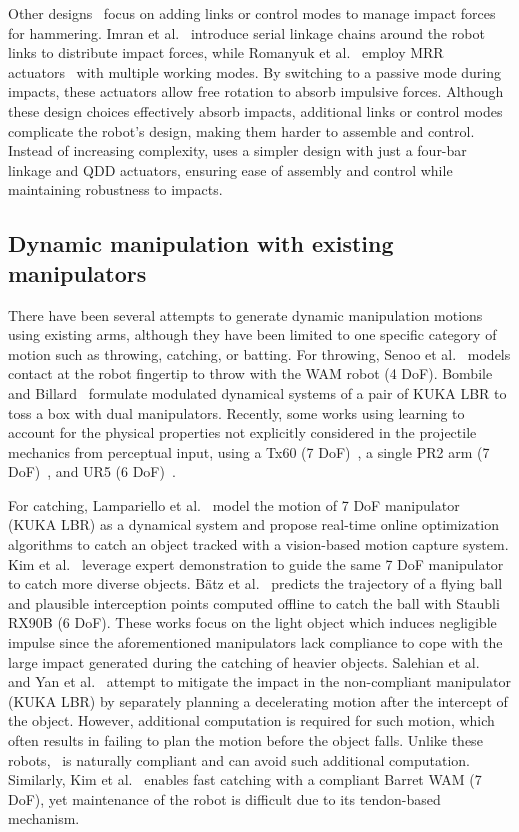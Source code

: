 Other designs~\cite{imran2016impulse, romanyuk2019multiple} focus on adding links or control modes to manage impact forces for hammering. Imran et al.~\cite{imran2016impulse} introduce serial linkage chains around the robot links to distribute impact forces, while Romanyuk et al.~\cite{romanyuk2019multiple} employ MRR actuators~\cite{liu2008development} with multiple working modes. By switching to a passive mode during impacts, these actuators allow free rotation to absorb impulsive forces. Although these design choices effectively absorb impacts, additional links or control modes complicate the robot’s design, making them harder to assemble and control. Instead of increasing complexity, \robot uses a simpler design with just a four-bar linkage and QDD actuators, ensuring ease of assembly and control while maintaining robustness to impacts.

\subsection{Dynamic manipulation with existing manipulators}
There have been several attempts to generate dynamic manipulation motions using existing arms, although they have been limited to one specific category of motion such as throwing, catching, or batting. For throwing, Senoo et al.~\cite{high_speed_throwing} models contact at the robot fingertip to throw with the WAM robot (4 DoF). Bombile and Billard~\cite{kuka_grabbing_tossing} formulate modulated dynamical systems of a pair of KUKA LBR to toss a box with dual manipulators. Recently, some works using learning to account for the physical properties not explicitly considered in the projectile mechanics from perceptual input, using a Tx60 (7 DoF)~\cite{throwing_visual_feedback}, a single PR2 arm (7 DoF)~\cite{dppt}, and UR5 (6 DoF)~\cite{zeng2020tossingbot}. 

For catching, Lampariello et al.~\cite{planning_for_catching}  model the motion of 7 DoF manipulator (KUKA LBR) as a dynamical system and propose real-time online optimization algorithms to catch an object tracked with a vision-based motion capture system. Kim et al.~\cite{kim2014catching} leverage expert demonstration to guide the same 7 DoF manipulator to catch more diverse objects.  B\"{a}tz et al.~\cite{batz2010dynamic} predicts the trajectory of a flying ball and plausible interception points computed offline to catch the ball with Staubli RX90B (6 DoF). 
These works focus on the light object which induces negligible impulse since the aforementioned manipulators lack compliance to cope with the large impact generated during the catching of heavier objects. Salehian et al.~\cite{salehian2016dynamical} and Yan et al.~\cite{yan2024impact} attempt to mitigate the impact in the non-compliant manipulator (KUKA LBR) by separately planning a decelerating motion after the intercept of the object.  However, additional computation is required for such motion, which often results in failing to plan the motion before the object falls. 
Unlike these robots, \robot~is naturally compliant and can avoid such additional computation.  Similarly, Kim et al.~\cite{free_flying} enables fast catching with a compliant Barret WAM (7 DoF), yet maintenance of the robot is difficult due to its tendon-based mechanism.

